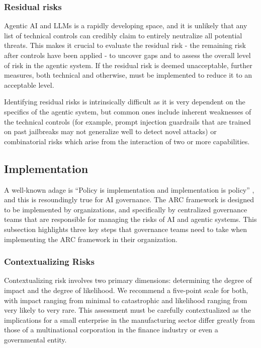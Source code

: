 \documentclass{article}
\begin{document}
\subsubsection{Residual risks}

Agentic AI and LLMs is a rapidly developing space, and it is unlikely that any list of technical controls can credibly claim to entirely neutralize all potential threats. This makes it crucial to evaluate the residual risk - the remaining risk after controls have been applied - to uncover gaps and to assess the overall level of risk in the agentic system. If the residual risk is deemed unacceptable, further measures, both technical and otherwise, must be implemented to reduce it to an acceptable level. 

Identifying residual risks is intrinsically difficult as it is very dependent on the specifics of the agentic system, but common ones include inherent weaknesses of the technical controls (for example, prompt injection guardrails that are trained on past jailbreaks may not generalize well to detect novel attacks) or combinatorial risks which arise from the interaction of two or more capabilities.

\subsection{Implementation}

A well-known adage is ``Policy is implementation and implementation is policy'' \citet{ho2010_implementation}, and this is resoundingly true for AI governance. The ARC framework is designed to be implemented by organizations, and specifically by centralized governance teams that are responsible for managing the risks of AI and agentic systems. This subsection highlights three key steps that governance teams need to take when implementing the ARC framework in their organization.

\subsubsection{Contextualizing Risks}

Contextualizing risk involves two primary dimensions: determining the degree of impact and the degree of likelihood. We recommend a five-point scale for both, with impact ranging from minimal to catastrophic and likelihood ranging from very likely to very rare. This assessment must be carefully contextualized as the implications for a small enterprise in the manufacturing sector differ greatly from those of a multinational corporation in the finance industry or even a governmental entity. 
\end{document}
